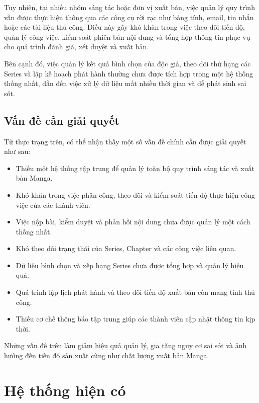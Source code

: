 Tuy nhiên, tại nhiều nhóm sáng tác hoặc đơn vị xuất bản, việc quản lý quy trình vẫn được thực hiện thông qua các công cụ rời rạc như bảng tính, email, tin nhắn hoặc các tài liệu thủ công. Điều này gây khó khăn trong việc theo dõi tiến độ, quản lý công việc, kiểm soát phiên bản nội dung và tổng hợp thông tin phục vụ cho quá trình đánh giá, xét duyệt và xuất bản.

Bên cạnh đó, việc quản lý kết quả bình chọn của độc giả, theo dõi thứ hạng các Series và lập kế hoạch phát hành thường chưa được tích hợp trong một hệ thống thống nhất, dẫn đến việc xử lý dữ liệu mất nhiều thời gian và dễ phát sinh sai sót.

\subsection{Vấn đề cần giải quyết}
\label{subsec:van_de_can_giai_quyet}

Từ thực trạng trên, có thể nhận thấy một số vấn đề chính cần được giải quyết như sau:
\begin{itemize}
    \item Thiếu một hệ thống tập trung để quản lý toàn bộ quy trình sáng tác và xuất bản Manga.
    \item Khó khăn trong việc phân công, theo dõi và kiểm soát tiến độ thực hiện công việc của các thành viên.
    \item Việc nộp bài, kiểm duyệt và phản hồi nội dung chưa được quản lý một cách thống nhất.
    \item Khó theo dõi trạng thái của Series, Chapter và các công việc liên quan.
    \item Dữ liệu bình chọn và xếp hạng Series chưa được tổng hợp và quản lý hiệu quả.
    \item Quá trình lập lịch phát hành và theo dõi tiến độ xuất bản còn mang tính thủ công.
    \item Thiếu cơ chế thông báo tập trung giúp các thành viên cập nhật thông tin kịp thời.
\end{itemize}
Những vấn đề trên làm giảm hiệu quả quản lý, gia tăng nguy cơ sai sót và ảnh hưởng đến tiến độ sản xuất cũng như chất lượng xuất bản Manga.

\section{Hệ thống hiện có}
\label{sec:he_thong_hien_co}

